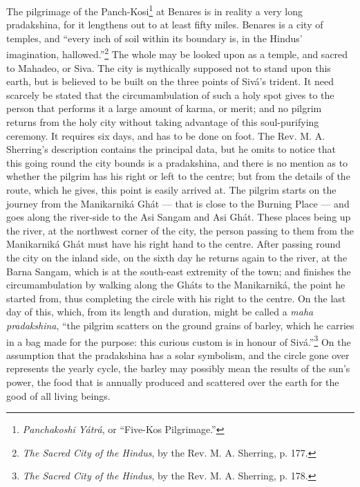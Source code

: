 \documentclass[a4paper, 11pt, oneside, polutonikogreek, english]{article}
\begin{document}
The pilgrimage of the Panch-Kosi\footnote{\emph{Panchakoshi Yátrá}, or ``Five-Kos Pilgrimage.''} at Benares is in reality a very long pradakshina, for it lengthens out to at least fifty miles. Benares is a city of temples, and ``every inch of soil within its boundary is, in the Hindus' imagination, hallowed.''\footnote{\emph{The Sacred City of the Hindus}, by the Rev. M. A. Sherring, p. 177.} The whole may be looked upon as a temple, and sacred to Mahadeo, or Siva. The city is mythically supposed not to stand upon this earth, but is believed to be built on the three points of Sivá's trident. It need scarcely be stated that the circumambulation of such a holy spot gives to the person that performs it a large amount of karma, or merit; and no pilgrim returns from the holy city without taking advantage of this soul-purifying ceremony. It requires six days, and has to be done on foot. The Rev. M. A. Sherring's description contains the principal data, but he omits to notice that this going round the city bounds is a pradakshina, and there is no mention as to whether the pilgrim has his right or left to the centre; but from the details of the route, which he gives, this point is easily arrived at. The pilgrim starts on the journey from the Manikarniká Ghát --- that is close to the Burning Place --- and goes along the river-side to the Asi Sangam and Asi Ghát. These places being up the river, at the northwest corner of the city, the person passing to them from the Manikarniká Ghát must have his right hand to the centre. After passing round the city on the inland side, on the sixth day he returns again to the river, at the Barna Sangam, which is at the south-east extremity of the town; and finishes the circumambulation by walking along the Gháts to the Manikarniká, the point he started from, thus completing the circle with his right to the centre. On the last day of this, which, from its length and duration, might be called a \emph{maha pradakshina}, ``the pilgrim scatters on the ground grains of barley, which he carries in a bag made for the purpose: this curious custom is in honour of Sivá.''\footnote{\emph{The Sacred City of the Hindus}, by the Rev. M. A. Sherring, p. 178.} On the assumption that the pradakshina has a solar symbolism, and the circle gone over represents the yearly cycle, the barley may possibly mean the results of the sun's power, the food that is annually produced and scattered over the earth for the good of all living beings.
\end{document}
